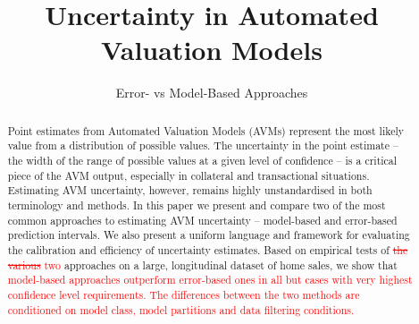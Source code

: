 \documentclass[colTwo]{anon}
\theoremstyle{definition}
\begin{document}

\title{Uncertainty in Automated Valuation Models}

\subtitle{Error- vs Model-Based Approaches} 
 	



\CCbY

\begin{abstracts}
\begin{abstract}
Point estimates from Automated Valuation Models (AVMs) represent the most likely value from a distribution of possible values. The uncertainty in the point estimate -- the width of the range of possible values at a given level of confidence -- is a critical piece of the AVM output, especially in collateral and transactional situations. Estimating AVM uncertainty, however, remains highly unstandardised in both terminology and methods. In this paper we present and compare two of the most common approaches to estimating AVM uncertainty -- model-based and error-based prediction intervals. We also present a uniform language and framework for evaluating the calibration and efficiency of uncertainty estimates. Based on empirical tests of \textcolor{red}{\st{the various} two} approaches on a large, longitudinal dataset of home sales, we show that \textcolor{red}{model-based approaches outperform error-based ones in all but cases with very highest confidence level requirements. The differences between the two methods are conditioned on model class, model partitions and data filtering conditions.} 

\end{abstract}

\end{abstracts}

\maketitle
\end{document}
